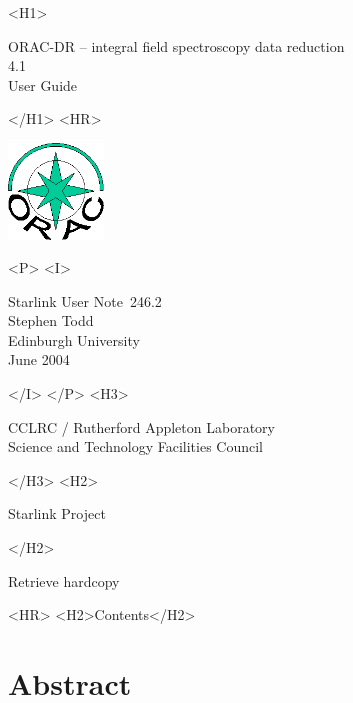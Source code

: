 \documentclass[twoside,11pt]{article}
\newcommand{\stardoccategory}  {Starlink User Note}
\newcommand{\stardocsource}    {sun\stardocnumber}
\newcommand{\stardocnumber}    {246.2}
\newcommand{\stardocauthors}   {Stephen Todd \\
                                Edinburgh University}
\newcommand{\stardocdate}      {June 2004}
\newcommand{\stardoctitle}     {ORAC-DR -- integral field spectroscopy
  data reduction}
\newcommand{\stardocversion}   {4.1}
\newcommand{\stardocmanual}    {User Guide}
\newcommand{\htmladdnormallink}[2]{#1}
\newcommand{\htmladdimg}[1]{}
\newcommand{\htmlref}[2]{#1}
\newcommand{\htmladdtonavigation}[1]{}
\newcommand{\xlabel}[1]{}
\renewcommand{\_}{\texttt{\symbol{95}}}
\begin{document}
\begin{htmlonly}
   \xlabel{}
   \begin{rawhtml} <H1> \end{rawhtml}
      \stardoctitle\\
      \stardocversion\\
      \stardocmanual
   \begin{rawhtml} </H1> <HR> \end{rawhtml}

\includegraphics[width=1.0in]{sun246_logo}

   \begin{rawhtml} <P> <I> \end{rawhtml}
   \stardoccategory\ \stardocnumber \\
   \stardocauthors \\
   \stardocdate
   \begin{rawhtml} </I> </P> <H3> \end{rawhtml}
      \htmladdnormallink{CCLRC / Rutherford Appleton Laboratory}
                        {http://www.cclrc.ac.uk} \\
      \htmladdnormallink{Science and Technology Facilities Council}
                        {http://www.stfc.ac.uk} \\
   \begin{rawhtml} </H3> <H2> \end{rawhtml}
      \htmladdnormallink{Starlink Project}{http://www.starlink.ac.uk/}
   \begin{rawhtml} </H2> \end{rawhtml}
   \htmladdnormallink{\htmladdimg{source.gif} Retrieve hardcopy}
      {http://www.starlink.ac.uk/cgi-bin/hcserver?\stardocsource}\\

  \label{stardoccontents}
  \begin{rawhtml}
    <HR>
    <H2>Contents</H2>
  \end{rawhtml}
  \htmladdtonavigation{\htmlref{\htmladdimg{contents_motif.gif}}
        {stardoccontents}}

  \section{\xlabel{abstract}Abstract}
\end{htmlonly}
\end{document}
